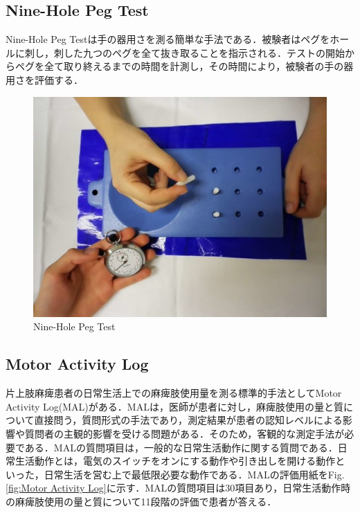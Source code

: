 \subsection*{Nine-Hole Peg Test}
Nine-Hole Peg Testは手の器用さを測る簡単な手法である．被験者はペグをホールに刺し，刺した九つのペグを全て抜き取ることを指示される．テストの開始からペグを全て取り終えるまでの時間を計測し，その時間により，被験者の手の器用さを評価する．
\begin{figure}[H]
  \centering
  \includegraphics[width=0.8\linewidth]{fig/ch1/nhpt}{}
  \caption{Nine-Hole Peg Test}
  \label{fig:nhpt}
\end{figure}


\subsection*{Motor Activity Log}

片上肢麻痺患者の日常生活上での麻痺肢使用量を測る標準的手法としてMotor Activity Log(MAL)\cite{Taub2006,Uswatte2005,Uswatte2000}がある．MALは，医師が患者に対し，麻痺肢使用の量と質について直接問う，質問形式の手法であり，測定結果が患者の認知レベルによる影響や質問者の主観的影響を受ける問題がある．そのため，客観的な測定手法が必要である．MALの質問項目は，一般的な日常生活動作に関する質問である．日常生活動作とは，電気のスイッチをオンにする動作や引き出しを開ける動作といった，日常生活を営む上で最低限必要な動作である．MALの評価用紙をFig.\ref{fig:Motor Activity Log}に示す．MALの質問項目は30項目あり，日常生活動作時の麻痺肢使用の量と質について11段階の評価で患者が答える．

